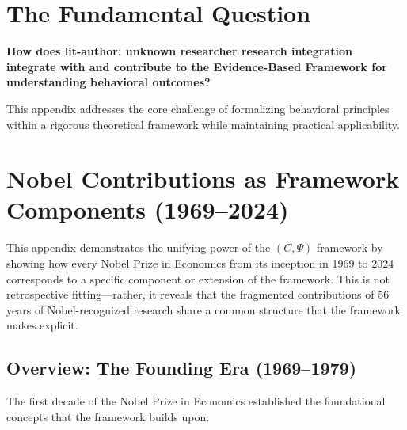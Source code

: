 \section{The Fundamental Question}
\label{sec:nob-fundamental}

\begin{tcolorbox}[
    colback=red!5!white,
    colframe=red!75!black,
    title={\textbf{Fundamental Question}}
]
\textbf{How does lit-author: unknown researcher research integration integrate with and contribute to the
Evidence-Based Framework for understanding behavioral outcomes?}

This appendix addresses the core challenge of formalizing behavioral principles
within a rigorous theoretical framework while maintaining practical applicability.
\end{tcolorbox}




\section{Nobel Contributions as Framework Components (1969--2024)}
\label{app:nobel}

This appendix demonstrates the unifying power of the $(C, \Psi)$ framework
by showing how every Nobel Prize in Economics from its inception in 1969 to 2024 
corresponds to a specific component or extension of the framework.
This is not retrospective fitting---rather, it reveals that the fragmented
contributions of 56 years of Nobel-recognized research share a common structure
that the framework makes explicit.

\subsection{Overview: The Founding Era (1969--1979)}

The first decade of the Nobel Prize in Economics established the foundational
concepts that the framework builds upon.

